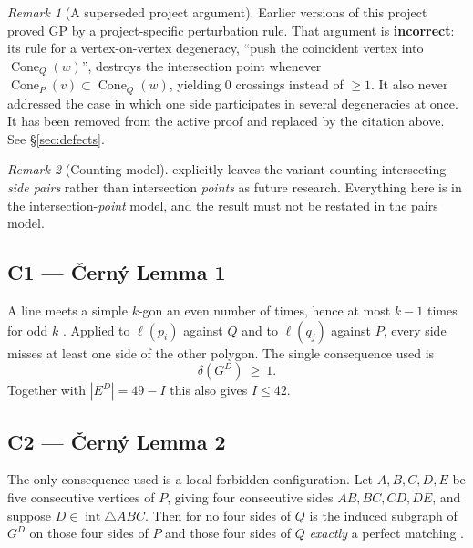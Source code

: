 \documentclass[11pt,a4paper]{article}
\theoremstyle{plain}
\theoremstyle{definition}
\theoremstyle{remark}
\newtheorem*{remark}{Remark}
\newcommand{\GD}{G^{D}}
\newcommand{\ED}{E^{D}}
\newcommand{\Cone}{\operatorname{Cone}}
\begin{document}
\begin{remark}[A superseded project argument]
Earlier versions of this project proved \textsf{GP} by a project-specific
perturbation rule. That argument is \textbf{incorrect}: its rule for a
vertex-on-vertex degeneracy, ``push the coincident vertex into $\Cone_Q(w)$'',
destroys the intersection point whenever $\Cone_P(v)\subset\Cone_Q(w)$, yielding
$0$ crossings instead of $\ge1$. It also never addressed the case in which one
side participates in several degeneracies at once. It has been removed from the
active proof and replaced by the citation above. See \S\ref{sec:defects}.
\end{remark}

\begin{remark}[Counting model]
\cite[\S9.3]{AckermanKeszeghRote2022} explicitly leaves the variant counting
intersecting \emph{side pairs} rather than intersection \emph{points} as future
research. Everything here is in the intersection-\emph{point} model, and the
result must not be restated in the pairs model.
\end{remark}

\subsection{\texorpdfstring{\textsf{C1} --- {\v C}ern{\'y} Lemma 1}{C1 -- Cerny Lemma 1}}\label{sec:c1}

A line meets a simple $k$-gon an even number of times, hence at most $k-1$ times
for odd $k$ \cite[Lemma 1]{CernyEtAl2003}. Applied to $\ell(p_i)$ against $Q$ and
to $\ell(q_j)$ against $P$, every side misses at least one side of the other
polygon. The single consequence used is
\[
  \delta(\GD)\ \ge\ 1 .
\]
Together with $|\ED|=49-I$ this also gives $I\le42$.

\subsection{\texorpdfstring{\textsf{C2} --- {\v C}ern{\'y} Lemma 2}{C2 -- Cerny Lemma 2}}

The only consequence used is a local forbidden configuration. Let
$A,B,C,D,E$ be five consecutive vertices of $P$, giving four consecutive sides
$AB,BC,CD,DE$, and suppose $D\in\operatorname{int}\triangle ABC$. Then for no
four sides of $Q$ is the induced subgraph of $\GD$ on those four sides of $P$ and
those four sides of $Q$ \emph{exactly} a perfect matching
\cite[Lemma 2]{CernyEtAl2003}.
\end{document}
